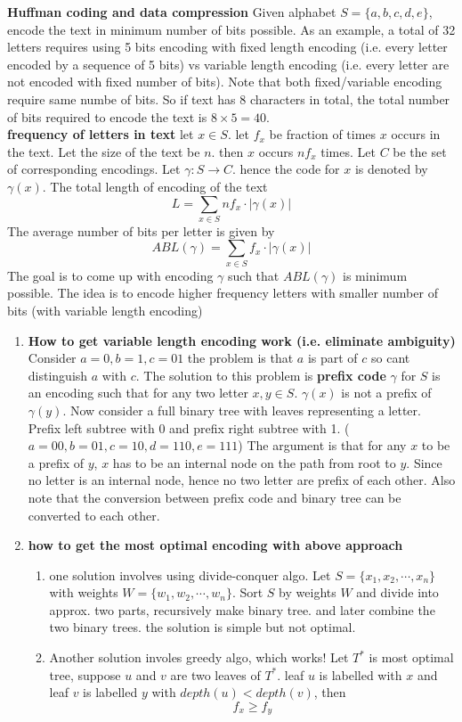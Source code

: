 \documentclass[11pt]{article}
\begin{document}
\begin{example}
  \textbf{Huffman coding and data compression} Given alphabet $S = \{ a, b, c, d, e\}$, encode the text in minimum number of bits possible. As an example, a total of 32 letters requires using 5 bits encoding with fixed length encoding (i.e. every letter encoded by a sequence of 5 bits) vs variable length encoding (i.e. every letter are not encoded with fixed number of bits). Note that both fixed/variable encoding require same numbe of bits. So if text has 8 characters in total, the total number of bits required to encode the text is $8\times 5 = 40$. \\
  \textbf{frequency of letters in text} let $x\in S$. let $f_x$ be fraction of times $x$ occurs in the text. Let the size of the text be $n$. then $x$ occurs $nf_x$ times. Let $C$ be the set of corresponding encodings. Let $\gamma: S\to C$. hence the code for $x$ is denoted by $\gamma(x)$. The total length of encoding of the text
  \[
    L = \sum_{x\in S} n f_x \cdot | \gamma(x) |
  \]
  The average number of bits per letter is given by
  \[
    ABL(\gamma) = \sum_{x\in S} f_x \cdot | \gamma(x) |
  \]
  The goal is to come up with encoding $\gamma$ such that $ABL(\gamma)$ is minimum possible. The idea is to encode higher frequency letters with smaller number of bits (with variable length encoding)

  \begin{enumerate}
    \item \textbf{How to get variable length encoding work (i.e. eliminate ambiguity)} Consider $a = 0, b = 1, c = 01$ the problem is that $a$ is part of $c$ so cant distinguish $a$ with $c$. The solution to this problem is \textbf{prefix code} $\gamma$ for $S$ is an encoding such that for any two letter $x,y\in S$. $\gamma(x)$ is not a prefix of $\gamma(y)$. Now consider a full binary tree with leaves representing a letter. Prefix left subtree with 0 and prefix right subtree with 1. ($a = 00, b=01, c = 10, d = 110, e = 111$) The argument is that for any $x$ to be a prefix of $y$, $x$ has to be an internal node on the path from root to $y$. Since no letter is an internal node, hence no two letter are prefix of each other. Also note that the conversion between prefix code and binary tree can be converted to each other.
    \item \textbf{how to get the most optimal encoding with above approach}
    \begin{enumerate}
      \item  one solution involves using divide-conquer algo. Let $S = \{ x_1, x_2, \cdots, x_n\}$ with weights $W = \{ w_1, w_2, \cdots, w_n\}$. Sort $S$ by weights $W$ and divide into approx. two parts, recursively make binary tree. and later combine the two binary trees. the solution is simple but not optimal.
      \item Another solution involes greedy algo, which works! Let $T^*$ is most optimal tree, suppose $u$ and $v$ are two leaves of $T^*$. leaf $u$ is labelled with $x$ and leaf $v$ is labelled $y$ with $depth(u) < depth(v)$, then
      \[
        f_x \geq f_y
      \]
    \end{enumerate}


\end{enumerate}
\end{example}
\end{document}
